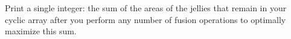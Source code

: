 
Print a single integer: the sum of the areas of the jellies that remain in your cyclic array after you perform any number of fusion operations to optimally maximize this sum.
